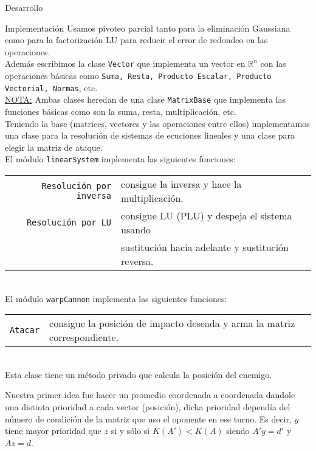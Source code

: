 \begin{section}{Desarrollo}
\begin{subsection}{Implementación}
		Usamos pivoteo parcial tanto para la eliminación Gaussiana como para la factorización LU para reducir el error de redondeo en las operaciones.\\
		
		Además escribimos la clase \texttt{Vector} que implementa un vector en $\mathbb{R}^n$ con las operaciones básicas como \texttt{Suma, Resta,
		Producto Escalar, Producto Vectorial, Normas}, etc.\\
		
		\underline{NOTA:} Ambas clases heredan de una clase \texttt{MatrixBase} que implementa las funciones básicas como son la suma, resta, multiplicación, etc.\\
		
		Teniendo la base (matrices, vectores y las operaciones entre ellos) implementamos una clase para la resolución de sistemas de ecuciones lineales y una clase para elegir la matriz de ataque.\\
		
		El módulo \texttt{linearSystem} implementa las siguientes funciones:\\
		
		\begin{tabular}{rl}
			\texttt{Resolución por inversa} & consigue la inversa y hace la multiplicación.\\
			\texttt{Resolución por LU} & consigue LU (PLU) y despeja el sistema usando\\
									   & sustitución hacia adelante y sustitución reversa.\\
		\end{tabular}\\
		
		El módulo \texttt{warpCannon} implementa las siguientes funciones:\\
		
		\begin{tabular}{rl}
			\texttt{Atacar} & consigue la posición de impacto deseada y arma la matriz correspondiente.\\
		\end{tabular}\\
		
		Esta clase tiene un método privado que calcula la posición del enemigo.
		
		Nuestra primer idea fue hacer un promedio coordenada a coordenada dandole una distinta prioridad a cada vector (posición), dicha prioridad dependía del número de condición de la matriz que uso el oponente en ese turno. Es decir, $y$ tiene mayor prioridad que $z$ si y sólo si $K(A')<K(A)$ siendo $A'y=d'$ y $Az=d$.
		

\end{subsection}
\end{section}
